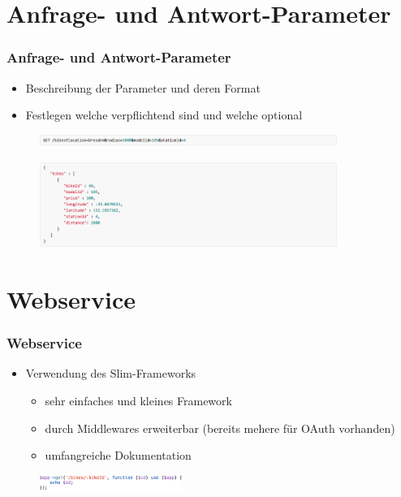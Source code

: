 \section{Anfrage- und Antwort-Parameter}
\begin{frame}
	\frametitle*{Anfrage- und Antwort-Parameter}
	\begin{itemize}
		\item Beschreibung der Parameter und deren Format
		\item Festlegen welche verpflichtend sind und welche optional
	\end{itemize}
	\begin{figure}
		\centering
		\includegraphics[height=4mm]{pics/request_example.png}
	\end{figure}
	\begin{figure}
		\centering
		\includegraphics[height=28mm]{pics/response_example.png}
	\end{figure}
\end{frame}

\section{Webservice}
\begin{frame}
	\frametitle*{Webservice}
	\begin{itemize}
		\item Verwendung des Slim-Frameworks
		\begin{itemize}
			\item sehr einfaches und kleines Framework
			\item durch Middlewares erweiterbar (bereits mehere für OAuth vorhanden)
			\item umfangreiche Dokumentation
		\end{itemize}
	\end{itemize}
\begin{figure}
		\centering
		\includegraphics[height=5mm]{pics/slim.png}
	\end{figure}
\end{frame}

